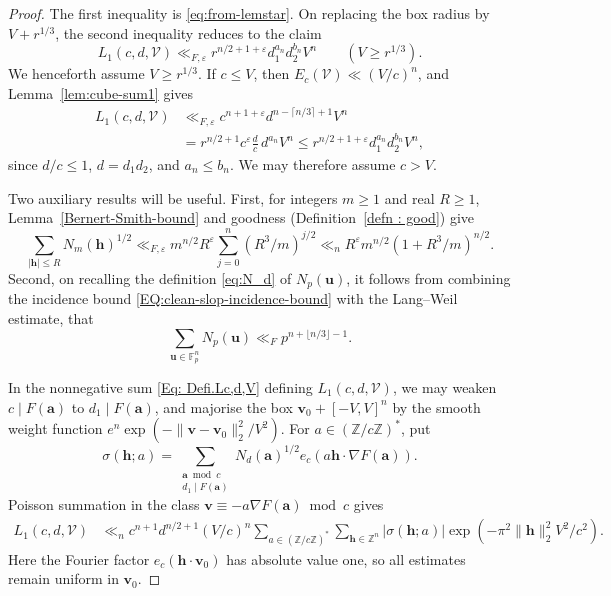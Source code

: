 \documentclass[a4paper,11pt, twoside,reqno]{amsart}
\theoremstyle{plain}
\theoremstyle{definition}
\theoremstyle{remark}
\newcommand{\bfh}{\bm{h}}
\newcommand{\bfa}{\bm{a}}
\newcommand{\bu}{\bm{u}}
\newcommand{\bfv}{\bm{v}}
\newcommand{\ZZ}{\mathbb{Z}}
\newcommand{\ve}{\varepsilon}
\renewcommand{\le}{\leqslant}
\renewcommand{\ge}{\geqslant}
\newcommand{\FF}{\mathbb{F}}
\numberwithin{equation}{section}
\begin{document}
\begin{proof}
The first inequality is \eqref{eq:from-lemstar}.
On replacing the box radius by $V+r^{1/3}$,
the second inequality reduces to the claim
\[
 L_1(c,d,\mathcal V)
 \ll_{F,\ve}r^{n/2+1+\ve}d_1^{a_n}d_2^{b_n}V^n
 \qquad(V\ge r^{1/3}).
\]
We henceforth assume $V\ge r^{1/3}$.
If $c\le V$, then $E_c(\mathcal V)\ll(V/c)^n$, and
Lemma~\ref{lem:cube-sum1} gives
\begin{align*}
L_1(c,d,\mathcal V)
&\ll_{F,\ve}c^{n+1+\ve}d^{n-\lceil n/3\rceil+1}V^n\\
&= r^{n/2+1}c^\ve\frac dc\,d^{a_n}V^n
\le r^{n/2+1+\ve}d_1^{a_n}d_2^{b_n}V^n,
\end{align*}
since $d/c\le 1$, $d=d_1d_2$, and $a_n\le b_n$.
We may therefore assume $c>V$.

Two auxiliary results will be useful.
First, for integers $m\ge1$ and real $R\ge1$,
Lemma~\ref{Bernert-Smith-bound} and goodness
(Definition~\ref{defn : good}) give
\begin{equation}\label{eq:good-kernel-average}
\sum_{|\bfh|\le R}N_m(\bfh)^{1/2}
\ll_{F,\ve}m^{n/2}R^\ve \sum_{j=0}^n(R^3/m)^{j/2}
\ll_n R^\ve m^{n/2}(1+R^3/m)^{n/2}.
\end{equation}
Second, 
on recalling the definition \eqref{eq:N_d}
of $N_p(\bu)$, it follows from combining 
the incidence bound \eqref{EQ:clean-slop-incidence-bound}
 with the Lang--Weil estimate, that
\begin{equation}\label{eq:laval_dim}
 \sum_{\bu\in\FF_p^n}N_p(\bu)
 \ll_F p^{n+\lfloor n/3\rfloor-1}.
\end{equation}

In the nonnegative sum \eqref{Eq: Defi.Lc,d,V}
defining $L_1(c,d,\mathcal V)$, we may weaken $c\mid F(\bfa)$
to $d_1\mid F(\bfa)$, and majorise the box $\bfv_0+[-V,V]^n$ by the
smooth weight function $e^n\exp(-\|\bfv-\bfv_0\|_2^2/V^2)$.
For $a\in(\ZZ/c\ZZ)^\ast$, put
\[
 \sigma(\bfh;a)=
 \sum_{\substack{\bfa\bmod c\\d_1\mid F(\bfa)}}
 N_d(\bfa)^{1/2}e_c(a\bfh\cdot\nabla F(\bfa)).
\]
Poisson summation in the class
$\bfv\equiv-a\nabla F(\bfa)\bmod c$ gives
\begin{equation}\label{eq:onion-poisson}
\begin{aligned}
 L_1(c,d,\mathcal V)
 &\ll_n c^{n+1}d^{n/2+1}(V/c)^n
\sum_{a \in (\ZZ/c\ZZ)^*}\sum_{\bfh\in\ZZ^n}
 |\sigma(\bfh;a)|
 \exp(-\pi^2\|\bfh\|_2^2V^2/c^2).
\end{aligned}
\end{equation}
Here the Fourier factor $e_c(\bfh\cdot\bfv_0)$ has absolute
value one, so all estimates remain uniform in $\bfv_0$.


\end{proof}
\end{document}
